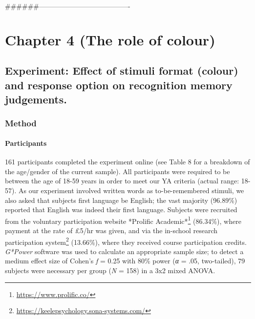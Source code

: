 \documentclass[
  11pt,
]{article}
\begin{document}
\#\#\#\#\#\#----------------------------------------

\newpage

\hypertarget{chapter-4-the-role-of-colour}{%
\section{Chapter 4 (The role of
colour)}\label{chapter-4-the-role-of-colour}}

\hypertarget{experiment-effect-of-stimuli-format-colour-and-response-option-on-recognition-memory-judgements.}{%
\subsection{Experiment: Effect of stimuli format (colour) and response
option on recognition memory
judgements.}\label{experiment-effect-of-stimuli-format-colour-and-response-option-on-recognition-memory-judgements.}}

\hypertarget{method-3}{%
\subsubsection{Method}\label{method-3}}

\hypertarget{participants-3}{%
\paragraph{Participants}\label{participants-3}}

161 participants completed the experiment online (see Table 8 for a
breakdown of the age/gender of the current sample). All participants
were required to be between the age of 18-59 years in order to meet our
YA criteria (actual range: 18-57). As our experiment involved written
words as to-be-remembered stimuli, we also asked that subjects first
language be English; the vast majority (96.89\%) reported that English
was indeed their first language. Subjects were recruited from the
voluntary participation website
*Prolific Academic*\footnote{\url{https://www.prolific.co/}} (86.34\%),
where payment at the rate of £5/hr was given, and via the in-school
research participation system\footnote{\url{https://keelepsychology.sona-systems.com/}}
(13.66\%), where they received course participation credits.
\emph{G*Power} software was used to calculate an appropriate sample
size; to detect a medium effect size of Cohen's \emph{f} = 0.25 with
80\% power (\emph{α} = .05, two-tailed), 79 subjects were necessary per
group (\emph{N} = 158) in a 3x2 mixed ANOVA.
\end{document}
